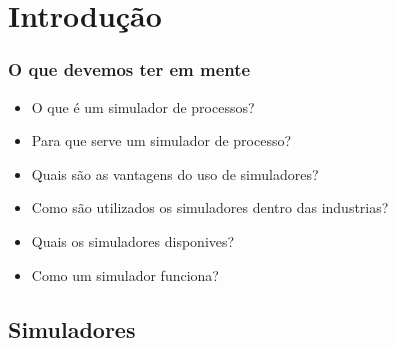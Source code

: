 \documentclass[aspectratio=169]{beamer}
\begin{document}
\section{Introdução}
\begin{frame}
	\frametitle{O que devemos ter em mente}
	\begin{itemize}
		\item O que é um simulador de processos?
		\item Para que serve um simulador de processo?
		\item Quais são as vantagens do uso de simuladores?
		\item Como são utilizados os simuladores dentro das industrias?
		\item Quais os simuladores disponives? 
		\item Como um simulador funciona?
	\end{itemize}
\end{frame}

\subsection*{Simuladores}
\end{document}
